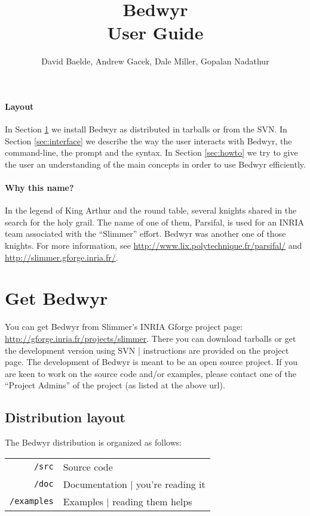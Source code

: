 \documentclass{article}
\title{{\Huge Bedwyr} \\ User Guide}
\author{David Baelde, Andrew Gacek, Dale Miller, Gopalan Nadathur}
\begin{document}
\maketitle

\tableofcontents

\paragraph{Layout}
In Section \ref{sec:install} we install Bedwyr as distributed
in tarballs or from the SVN.
In Section \ref{sec:interface} we describe the way the user interacts with 
Bedwyr, the command-line, the prompt and the syntax.
In Section \ref{sec:howto} we try to give the user an understanding
of the main concepts in order to use Bedwyr efficiently.

\paragraph{Why this name?}
In the legend of King Arthur and the round table, several knights
shared in the search for the holy grail.  The name of one of them,
Parsifal, is used for an INRIA team associated with the ``Slimmer''
effort.  Bedwyr was another one of those knights.  For more
information, see \url{http://www.lix.polytechnique.fr/parsifal/} and
\url{http://slimmer.gforge.inria.fr/}.


\newpage
\section{Get Bedwyr}
\label{sec:install}

You can get Bedwyr from Slimmer's INRIA Gforge project page:
\url{http://gforge.inria.fr/projects/slimmer}.
There you can download tarballs or get the development version using SVN
| instructions are provided on the project page.  The development of
Bedwyr is meant to be an open source project.  If you are keen
to work on the source code and/or examples, please contact
one of the ``Project Admins'' of the project (as listed at the above url).

\subsection{Distribution layout}

The Bedwyr distribution is organized as follows:

\begin{tabular}{rl}
  \texttt{/src}      & Source code \\
  \texttt{/doc}      &  Documentation | you're reading it \\
  \texttt{/examples} &  Examples | reading them helps
\end{tabular}
\end{document}
